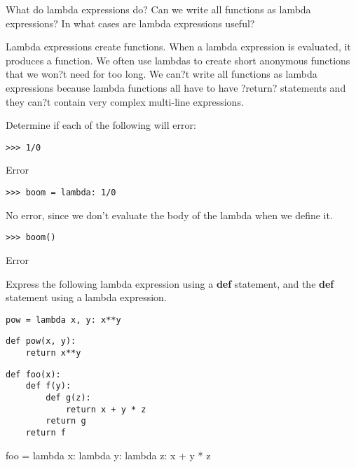 \question
What do lambda expressions do? Can we write all functions as lambda expressions? In what cases are lambda expressions useful? 
\begin{solution}[0.75in]
Lambda expressions create functions. When a lambda expression is evaluated, it produces a function. We often use lambdas to create short anonymous functions that we won?t need for too long. \newline We can?t write all functions as lambda expressions because lambda functions all have to have ?return? statements and they can?t contain very complex multi-line expressions.
\end{solution}

\question
Determine if each of the following will error: \newline
\begin{lstlisting}
>>> 1/0
\end{lstlisting}
\begin{solution}[0.25in]
Error
\end{solution}
\begin{lstlisting}
>>> boom = lambda: 1/0
\end{lstlisting}
\begin{solution}[0.25in]
No error, since we don't evaluate the body of the lambda when we define it.
\end{solution}
\begin{lstlisting}
>>> boom()
\end{lstlisting}
\begin{solution}[0.25in]
Error
\end{solution}


\question
Express the following lambda expression using a \textbf{def} statement, and the \textbf{def} statement using a lambda expression.
\begin{lstlisting}
pow = lambda x, y: x**y
\end{lstlisting}
\begin{solution}[0.5in]
\begin{verbatim}
def pow(x, y):
    return x**y
\end{verbatim}
\end{solution}

\begin{lstlisting}
def foo(x):
    def f(y):
        def g(z):
            return x + y * z
        return g
    return f
\end{lstlisting}
\begin{solution}[0.25in]
foo = lambda x: lambda y: lambda z: x + y * z
\end{solution}
\newpage

